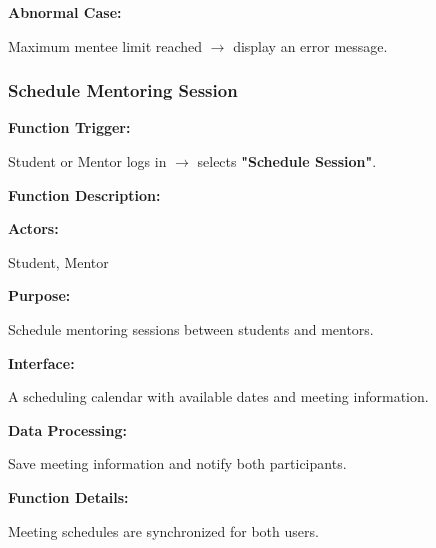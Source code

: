 \textbf{Abnormal Case:}

Maximum mentee limit reached $\rightarrow$ display an error message.

%

\subsubsection{Schedule Mentoring Session}

\textbf{Function Trigger:}

Student or Mentor logs in $\rightarrow$ selects \textbf{"Schedule Session"}.

\vspace{0.3cm}

\textbf{Function Description:}

\textbf{Actors:}

Student, Mentor

\vspace{0.2cm}

\textbf{Purpose:}

Schedule mentoring sessions between students and mentors.

\vspace{0.2cm}

\textbf{Interface:}

A scheduling calendar with available dates and meeting information.

\vspace{0.2cm}

\textbf{Data Processing:}

Save meeting information and notify both participants.

\vspace{0.3cm}

\textbf{Function Details:}

Meeting schedules are synchronized for both users.

%

